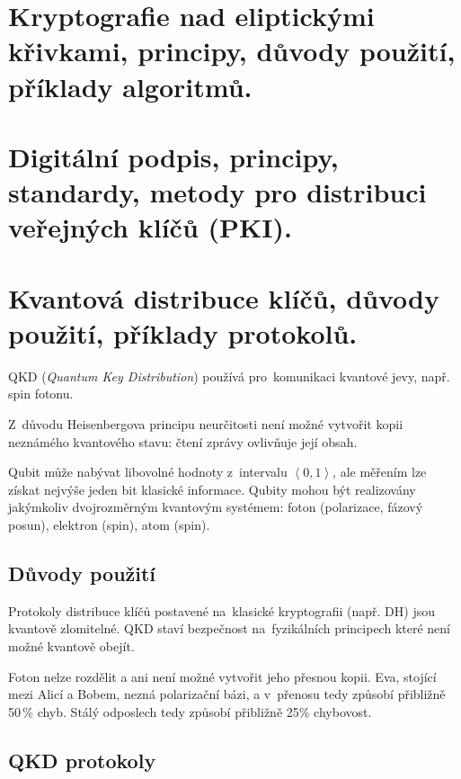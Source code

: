 \clearpage
\section{Kryptografie nad eliptickými křivkami, principy, důvody použití, příklady algoritmů.}


\clearpage
\section{Digitální podpis, principy, standardy, metody pro distribuci veřejných klíčů (PKI).}


\clearpage
\section{Kvantová distribuce klíčů, důvody použití, příklady protokolů.}

QKD (\emph{Quantum Key Distribution}) používá pro~komunikaci kvantové jevy, např. spin fotonu.

Z~důvodu Heisenbergova principu neurčitosti není možné vytvořit kopii neznámého kvantového stavu: čtení zprávy ovlivňuje její obsah.

Qubit může nabývat libovolné hodnoty z~intervalu $\left<0,1\right>$, ale měřením lze získat nejvýše jeden bit klasické informace.
Qubity mohou být realizovány jakýmkoliv dvojrozměrným kvantovým systémem: foton (polarizace, fázový posun), elektron (spin), atom (spin).


\subsection{Důvody použití}

Protokoly distribuce klíčů postavené na~klasické kryptografii (např. DH) jsou kvantově zlomitelné.
QKD staví bezpečnost na~fyzikálních principech které není možné kvantově obejít.

Foton nelze rozdělit a ani není možné vytvořit jeho přesnou kopii.
Eva, stojící mezi Alicí a Bobem, nezná polarizační bázi, a v~přenosu tedy způsobí přibližně 50\,\% chyb.
Stálý odposlech tedy způsobí přibližně 25\% chybovost.


\subsection{QKD protokoly}

